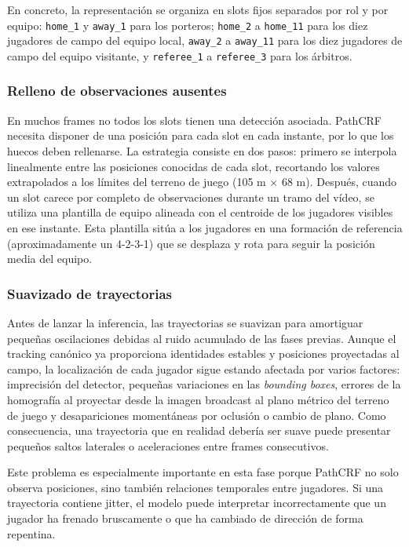 En concreto, la representación se organiza en slots fijos separados por rol y por equipo: \texttt{home\_1} y \texttt{away\_1} para los porteros; \texttt{home\_2} a \texttt{home\_11} para los diez jugadores de campo del equipo local, \texttt{away\_2} a \texttt{away\_11} para los diez jugadores de campo del equipo visitante, y \texttt{referee\_1} a \texttt{referee\_3} para los árbitros.

\subsubsection{Relleno de observaciones ausentes}
En muchos frames no todos los slots tienen una detección asociada. PathCRF necesita disponer de una posición para cada slot en cada instante, por lo que los huecos deben rellenarse. La estrategia consiste en dos pasos: primero se interpola linealmente entre las posiciones conocidas de cada slot, recortando los valores extrapolados a los límites del terreno de juego (105 m × 68 m). Después, cuando un slot carece por completo de observaciones durante un tramo del vídeo, se utiliza una plantilla de equipo alineada con el centroide de los jugadores visibles en ese instante. Esta plantilla sitúa a los jugadores en una formación de referencia (aproximadamente un 4-2-3-1) que se desplaza y rota para seguir la posición media del equipo.

\subsubsection{Suavizado de trayectorias}
Antes de lanzar la inferencia, las trayectorias se suavizan para amortiguar pequeñas oscilaciones debidas al ruido acumulado de las fases previas. Aunque el tracking canónico ya proporciona identidades estables y posiciones proyectadas al campo, la localización de cada jugador sigue estando afectada por varios factores: imprecisión del detector, pequeñas variaciones en las \textit{bounding boxes}, errores de la homografía al proyectar desde la imagen broadcast al plano métrico del terreno de juego y desapariciones momentáneas por oclusión o cambio de plano. Como consecuencia, una trayectoria que en realidad debería ser suave puede presentar pequeños saltos laterales o aceleraciones entre frames consecutivos.

Este problema es especialmente importante en esta fase porque PathCRF no solo observa posiciones, sino también relaciones temporales entre jugadores. Si una trayectoria contiene jitter, el modelo puede interpretar incorrectamente que un jugador ha frenado bruscamente o que ha cambiado de dirección de forma repentina.

